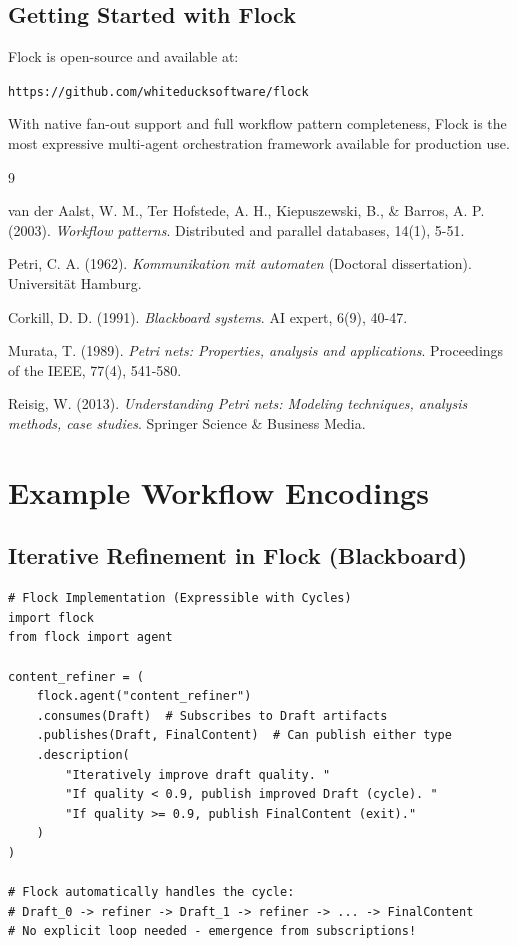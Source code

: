 \documentclass[11pt]{article}
\begin{document}
\subsection{Getting Started with Flock}

Flock is open-source and available at:
\begin{center}
\texttt{https://github.com/whiteducksoftware/flock}
\end{center}

With native fan-out support and full workflow pattern completeness, Flock is the most expressive multi-agent orchestration framework available for production use.

\begin{thebibliography}{9}

van der Aalst, W. M., Ter Hofstede, A. H., Kiepuszewski, B., \& Barros, A. P. (2003).
\textit{Workflow patterns}.
Distributed and parallel databases, 14(1), 5-51.

Petri, C. A. (1962).
\textit{Kommunikation mit automaten} (Doctoral dissertation).
Universität Hamburg.

Corkill, D. D. (1991).
\textit{Blackboard systems}.
AI expert, 6(9), 40-47.

Murata, T. (1989).
\textit{Petri nets: Properties, analysis and applications}.
Proceedings of the IEEE, 77(4), 541-580.

Reisig, W. (2013).
\textit{Understanding Petri nets: Modeling techniques, analysis methods, case studies}.
Springer Science \& Business Media.

\end{thebibliography}

\appendix

\section{Example Workflow Encodings}

\subsection{Iterative Refinement in Flock (Blackboard)}

\begin{verbatim}
# Flock Implementation (Expressible with Cycles)
import flock
from flock import agent

content_refiner = (
    flock.agent("content_refiner")
    .consumes(Draft)  # Subscribes to Draft artifacts
    .publishes(Draft, FinalContent)  # Can publish either type
    .description(
        "Iteratively improve draft quality. "
        "If quality < 0.9, publish improved Draft (cycle). "
        "If quality >= 0.9, publish FinalContent (exit)."
    )
)

# Flock automatically handles the cycle:
# Draft_0 -> refiner -> Draft_1 -> refiner -> ... -> FinalContent
# No explicit loop needed - emergence from subscriptions!
\end{verbatim}
\end{document}
